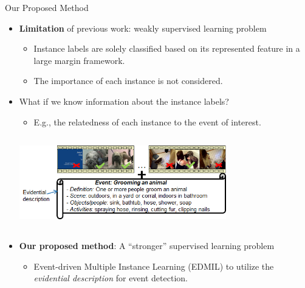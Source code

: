 \documentclass{beamer}
\begin{document}
\begin{frame}{Our Proposed Method} 	
	
\begin{itemize}	
	\item \textbf{Limitation} of previous work: weakly supervised learning problem
	\begin{itemize}	
		\item Instance labels are solely classified based on its represented feature in a large margin framework.
		\item The importance of each instance is not considered.
	\end{itemize}	
	
	\item What if we know information about the instance labels?
		\begin{itemize}	
			\item E.g., the relatedness of each instance to the event of interest.
		\end{itemize}	
		\begin{center}
			\includegraphics[width=9cm,height=4cm]{images/part4/eventkit.png}
		\end{center}
	\item \textbf{Our proposed method}: A ``stronger'' supervised learning problem
		\begin{itemize}	
			\item Event-driven Multiple Instance Learning (EDMIL) to utilize the \textit{evidential description} for event detection.
		\end{itemize}	

\end{itemize}	
	
\end{frame}	
\end{document}
